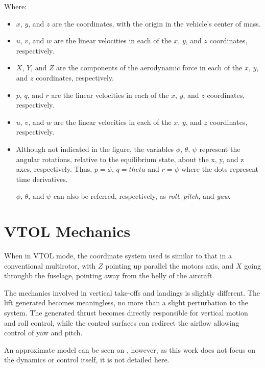 Where:


\begin{itemize}

\item $x$, $y$, and $z$ are the coordinates, with the origin in the vehicle's center of mass.
\item $u$, $v$, and $w$ are the linear velocities in each of the $x$, $y$, and $z$ coordinates, respectively.
\item $X$, $Y$, and $Z$ are the components of the aerodynamic force in each of the $x$, $y$, and $z$ coordinates, respectively.
\item $p$, $q$, and $r$ are the linear velocities in each of the $x$, $y$, and $z$ coordinates, respectively.
\item $u$, $v$, and $w$ are the linear velocities in each of the $x$, $y$, and $z$ coordinates, respectively.
\item  Although not indicated in the figure, the variables $\phi$, $\theta$, $\psi$ represent the angular rotations,
relative to the equilibrium state, about the x, y, and z axes, respectively. Thus, $p=\dot{\phi}$, $q = \dot{theta}$
and $r = \dot{\psi}$ where the dots represent time derivatives.

$\phi$, $\theta$, and $\psi$ can also be referred, respectively, as \textit{roll}, \textit{pitch}, and \textit{yaw}.

\end{itemize}

\section{VTOL Mechanics}

When in VTOL mode, the coordinate system used is similar to that in a conventional multirotor, with $Z$ pointing up parallel the motors axis, and $X$ going throughb the fuselage, pointing away from the belly of the aircraft.

The mechanics involved in vertical take-offs and landings is slightly different. The lift generated becomes meaningless, no more than a slight perturbation to the system. The generated thrust becomes directly responsible for vertical motion and roll control, while the control surfaces can redirect the airflow allowing control of yaw and pitch.

An approximate model can be seen on \cite{7487466}, however, as this work does not focus on the dynamics or control itself, it is not detailed here.


